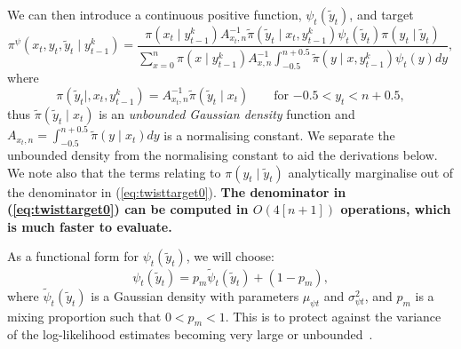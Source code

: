 \documentclass[a4paper]{article}
\begin{document}
We can then introduce a continuous positive function, $\psi_t\left(\tilde{y}_t\right)$, and target
\begin{equation}
    \pi^{\psi}\left(x_t, y_t, \tilde{y}_t \mid y^k_{t - 1}\right) = \frac{\pi\left(x_t \mid y^k_{t - 1}\right)A^{-1}_{x_t, n}\tilde{\pi}\left(\tilde{y}_t \mid x_t, y^k_{t - 1}\right)\psi_t\left(\tilde{y}_t\right)\pi\left(y_t \mid \tilde{y}_t\right)}{\sum_{x = 0}^n \pi\left(x \mid y^k_{t - 1}\right)A^{-1}_{x, n}\int_{-0.5}^{n + 0.5} \tilde{\pi}\left(y\mid x, y^k_{t - 1}\right)\psi_t\left(y\right)dy},\label{eq:twisttarget0}
\end{equation}
where 
\begin{equation*}
    \pi\left(\tilde{y}_t \mid, x_t, y^k_{t - 1}\right) = A^{-1}_{x_t, n} \tilde{\pi}\left(\tilde{y}_t \mid x_t\right) \qquad \mbox{for $-0.5 < y_t < n + 0.5$},
\end{equation*}
thus $\tilde{\pi}\left(\tilde{y}_t \mid x_t\right)$ is an \textit{unbounded Gaussian density} function and $A_{x_t, n} = \int_{-0.5}^{n + 0.5} \tilde{\pi}\left(y \mid x_t\right) dy$ is a normalising constant. We separate the unbounded density from the normalising constant to aid the derivations below. We note also that the terms relating to $\pi\left(y_t \mid \tilde{y}_t\right)$ analytically marginalise out of the denominator in (\ref{eq:twisttarget0}). \textbf{The denominator in (\ref{eq:twisttarget0}) can be computed in $O(4[n + 1])$ operations, which is much faster to evaluate.}

As a functional form for $\psi_t(\tilde{y}_t)$, we will choose:
\begin{equation}
    \psi_t\left(\tilde{y}_t\right) = p_m \tilde{\psi}_t\left(\tilde{y}_t\right) + \left(1 - p_m\right),\label{eq:mixdens}
\end{equation}
where $\tilde{\psi}_t\left(\tilde{y}_t\right)$ is a Gaussian density with parameters $\mu_{\psi t}$ and $\sigma^2_{\psi t}$, and $p_m$ is a mixing proportion such that $0 < p_m < 1$. This is to protect against the variance of the log-likelihood estimates becoming very large or unbounded~\citep[see][]{guarnieroetal:2017}. 
\end{document}
